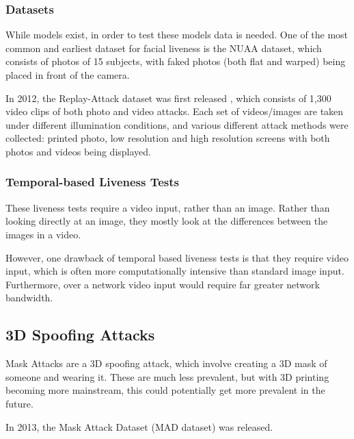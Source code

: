 \documentclass[10pt,a4paper]{article}
\begin{document}
        \subsubsection{Datasets}
        While models exist, in order to test these models data is needed. One of the most common and earliest dataset for facial liveness is the NUAA dataset,
        which consists of photos of 15 subjects, with faked photos (both flat and warped) being placed in front of the camera.  \cite{NUAADataset}

        In 2012, the Replay-Attack dataset was first released , which consists of 1,300 video clips of both photo and video attacks. Each
        set of videos/images are taken under different illumination conditions, and various different attack methods were collected: printed photo, low resolution and high resolution screens with both photos and 
        videos being displayed. \cite{ReplayAttackDataset}


        \subsubsection{Temporal-based Liveness Tests}
        These liveness tests require a video input, rather than an image. Rather than looking directly at an image, they mostly look at the differences between the images in a video.
        

        However, one drawback of temporal based liveness tests is that they require video input, which is often more computationally intensive than standard image input. Furthermore, over a network video input would require
        far greater network bandwidth.

        
    \subsection{3D Spoofing Attacks}
        Mask Attacks are a 3D spoofing attack, which involve creating a 3D mask of someone and wearing it. \cite{FaceSpoofingAttacksStudy} These are much less prevalent, but with 3D printing becoming more mainstream, this
        could potentially get more prevalent in the future.

        In 2013, the Mask Attack Dataset (MAD dataset) was released. \cite{3DMadDataset}
\end{document}
